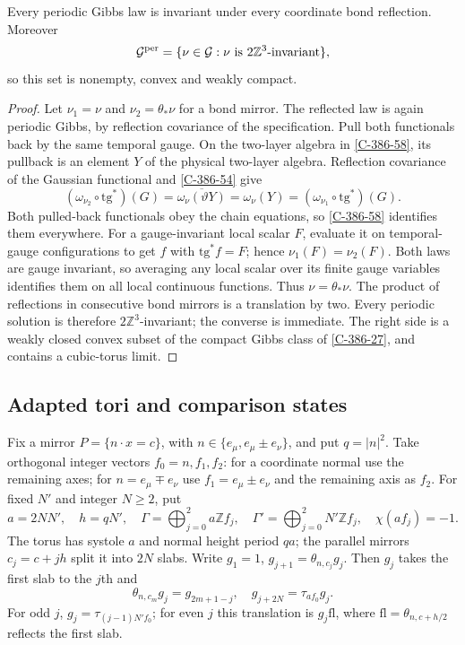 \documentclass[11pt,letterpaper,reqno]{amsart}
\makeatletter
\theoremstyle{definition}
\newcommand{\ms@minorstart}{%
  \pushQED{\qed}\renewcommand{\qedsymbol}{$\blacksquare$}}
\newenvironment{proposition}[1][]{\ms@minorstart\ms@proposition[#1]}
  {\popQED\endms@proposition}
\theoremstyle{remark}
\makeatother
\begin{document}
\begin{proposition}[Bond-reflection invariance]\label{C-386-59}
Every periodic Gibbs law is invariant under every coordinate
bond reflection. Moreover
\[
 \mathcal G^{\rm per}
       =\{\nu\in\mathcal G:\nu\text{ is }2\mathbb Z^3\text{-invariant}\},
\]
so this set is nonempty, convex and weakly compact.
\end{proposition}

\begin{proof}
Let $\nu_1=\nu$ and $\nu_2=\theta_*\nu$ for a bond mirror.
The reflected law is again periodic Gibbs, by reflection covariance
of the specification. Pull both functionals back by the same
temporal gauge. On the two-layer algebra in
\cref{C-386-58}, its pullback is an element $Y$ of the physical
two-layer algebra. Reflection covariance of the Gaussian functional
and \cref{C-386-54} give
\[
 (\omega_{\nu_2}\circ\mathrm{tg}^*)(G)
     =\overline{\omega_\nu(\vartheta Y)}
     =\omega_\nu(Y)
     =(\omega_{\nu_1}\circ\mathrm{tg}^*)(G).
\]
Both pulled-back functionals obey the chain equations, so
\cref{C-386-58} identifies them everywhere. For a gauge-invariant
local scalar $F$, evaluate it on temporal-gauge configurations
to get $f$ with $\mathrm{tg}^*f=F$; hence $\nu_1(F)=\nu_2(F)$.
Both laws are gauge invariant, so averaging any local scalar
over its finite gauge variables identifies them on all local
continuous functions. Thus $\nu=\theta_*\nu$.
The product of reflections in consecutive bond mirrors is a
translation by two. Every periodic solution is therefore
$2\mathbb Z^3$-invariant; the converse is immediate. The right
side is a weakly closed convex subset of the compact Gibbs
class of \cref{C-386-27}, and contains a cubic-torus limit.
\end{proof}

\subsection{Adapted tori and comparison states}

Fix a mirror $P=\{n\cdot x=c\}$, with
$n\in\{e_\mu,e_\mu\pm e_\nu\}$, and put $q=|n|^2$.
Take orthogonal integer vectors $f_0=n,f_1,f_2$: for a coordinate
normal use the remaining axes; for $n=e_\mu\mp e_\nu$ use
$f_1=e_\mu\pm e_\nu$ and the remaining axis as $f_2$.
For fixed $N'$ and integer $N\ge2$, put
\[
 a=2NN',\quad h=qN',\quad
 \Gamma=\bigoplus_{j=0}^2a\mathbb Zf_j,\quad
 \Gamma'=\bigoplus_{j=0}^2N'\mathbb Zf_j,\quad
                         \chi(af_j)=-1.
\]
The torus has systole $a$ and normal height period $qa$; the
parallel mirrors $c_j=c+jh$ split it into $2N$ slabs.
Write $g_1=1$, $g_{j+1}=\theta_{n,c_j}g_j$.
Then $g_j$ takes the first slab to the $j$th and
\[
 \theta_{n,c_m}g_j=g_{2m+1-j},\quad
 g_{j+2N}=\tau_{af_0}g_j.
\]
For odd $j$, $g_j=\tau_{(j-1)N'f_0}$; for even $j$ this
translation is $g_j\mathrm{fl}$, where
$\mathrm{fl}=\theta_{n,c+h/2}$ reflects the first slab.
\end{document}
